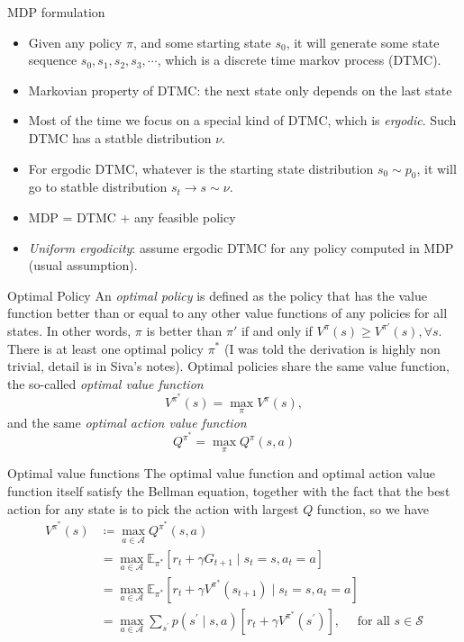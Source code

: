 \documentclass[handout]{beamer}
\begin{document}
\begin{frame}{MDP formulation}
    \small
    \begin{itemize}
        \item Given any policy $\pi$, and some starting state $s_0$, it will generate some state sequence $s_0, s_1, s_2, s_3,\cdots$, which is a discrete time markov process (DTMC).
        \item Markovian property of DTMC: the next state only depends on the last state 
        \item Most of the time we focus on a special kind of DTMC, which is \textit{ergodic}. Such DTMC has a statble distribution $\nu$. 
        \item For ergodic DTMC, whatever is the starting state distribution $s_0 \sim p_0$, it will go to statble distribution $s_t\rightarrow s \sim \nu$.
        \item MDP = DTMC + any feasible policy
        \item \textit{Uniform ergodicity}: assume ergodic DTMC for any policy computed in MDP (usual assumption).
    \end{itemize}
\end{frame}

\begin{frame}{Optimal Policy}
    An \textit{optimal policy} is defined as the policy that has the value function better than or equal to any other value functions of any policies for all states. In other words, $\pi$ is better than $\pi'$ if and only if $V^{\pi}(s) \geq V^{\pi'}(s), \forall s$. There is at least one optimal policy $\pi^*$ (I was told the derivation is highly non trivial, detail is in Siva's notes). Optimal policies share the same value function, the so-called \textit{optimal value function}
    $$
    V^{\pi^*}(s) = \max_{\pi} V^{\pi}(s),$$ and the same \textit{optimal action value function} 
    $$
    Q^{\pi^*} = \max_{\pi} Q^{\pi}(s,a)$$
\end{frame}

\begin{frame}{Optimal value functions}
    The optimal value function and optimal action value function itself satisfy the Bellman equation, together with the fact that the best action for any state is to pick the action with largest $Q$ function, so we have
    \begin{equation}
    \begin{aligned}
    V^{\pi^*}(s) & \coloneqq \max_{a\in\mathcal{A}} Q^{\pi^*}(s,a) \\
    &=\max_{a\in\mathcal{A}} \mathbb{E}_{\pi^*}\left[r_{t}+\gamma G_{t+1} \mid s_{t}=s, a_{t}=a\right] \\
    &=\max_{a\in\mathcal{A}} \mathbb{E}_{\pi^*}\left[r_{t}+\gamma V^{\pi^*}(s_{t+1}) \mid s_{t}=s, a_{t}=a\right] \\
    &=\max_{a\in\mathcal{A}} \sum_{s^{\prime}} p\left(s^{\prime}\mid s, a\right)\left[r_t +\gamma V^{\pi^*}\left(s^{\prime}\right)\right], \quad \text { for all } s \in \mathcal{S}
    \end{aligned}
    \end{equation}
\end{frame}
\end{document}
